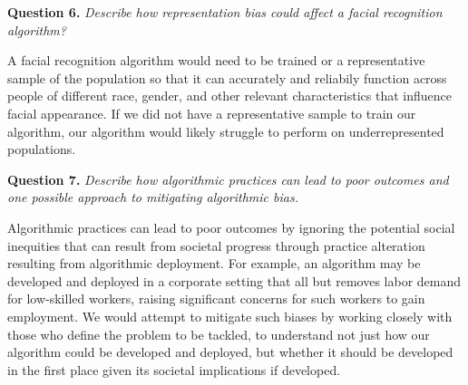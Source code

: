 \documentclass[11pt]{article}
\begin{document}
\textbf{Question 6.} \textit{Describe how representation bias could affect a facial recognition algorithm?}

A facial recognition algorithm would need to be trained or a representative sample of the population so that it can accurately and reliabily function across people of different race, gender, and other relevant characteristics that influence facial appearance.
If we did not have a representative sample to train our algorithm, our algorithm would likely struggle to perform on underrepresented populations.

\textbf{Question 7.} \textit{Describe how algorithmic practices can lead to poor outcomes and one possible approach to mitigating algorithmic bias.}

Algorithmic practices can lead to poor outcomes by ignoring the potential social inequities that can result from societal progress through practice alteration resulting from algorithmic deployment.
For example, an algorithm may be developed and deployed in a corporate setting that all but removes labor demand for low-skilled workers, raising significant concerns for such workers to gain employment.
We would attempt to mitigate such biases by working closely with those who define the problem to be tackled, to understand not just how our algorithm could be developed and deployed, but whether it should be developed in the first place given its societal implications if developed.
\end{document}
